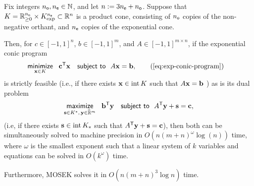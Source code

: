 \documentclass{article}
\begin{document}
\begin{lemma} \label{lem:mainlemma}
    Fix integers $n_{\sf o}, n_{\sf e} \in \mathbb N$, and let $n:= 3n_{\sf e} + n_{\sf o}$.
    Suppose that $K = \mathbb R_{\ge 0}^{n_{\sf o}} \times K^{n_{\sf e}}_{\exp} \subset \mathbb R^n$ is a product cone, consisting of $n_{\sf o}$ copies of the non-negative orthant, and $n_{\sf e}$ copies of the exponential cone. 
    
    Then, for
    $c \in [-1,1]^{n}$, $ b \in [-1,1]^m$, and $A \in [-1,1]^{m \times n}$,
    if the exponential conic program
    \begin{align*}
        &
        \mathop{\text{\sf minimize}}\limits_{
            \mat x \in K}~~ \mat c^{\sf T} \mat x
        \quad\text{\sf subject to}~~ A \mat x = \mat b,
        \tag{\ref{eq:exp-conic-program}}
    \end{align*}
    is strictly feasible (i.e., if there exists $\mathbf{x} \in \mathrm{int}\, K$  such that $A \mathbf{x} = \mathbf{b}$ )
    as is its dual problem
    \[
        \mathop{\text{\sf maximize}} 
            \limits_{
            \mathbf{s} \in K^*,\, \mathbf{y} \in \mskip1mu\overline{\mskip-1mu\mathbb R\!}\,^m} ~~ \mathbf{b}^{\sf T} \mathbf{y}
        \quad\text{\sf subject to}~~  A^{\sf T} \mathbf{y}  +  \mathbf{s} = \mathbf{c},
    \]
    (i.e, if there exists $\mathbf{s} \in \mathrm{int}\,K_*$ such that $A^{\sf T} \mathbf{y} + \mathbf{s} = \mathbf{c}$), 
    then both
    can be simultaneously
    solved to machine precision
    in $O(n (m+n)^{\omega} \log(n)
    )$ time,
    where $\omega$ is the smallest exponent such that a linear system of $k$ variables and equations can be solved in $O(k^\omega)$ time. 
    
    Furthermore, MOSEK solves it in $O(n (m+n)^3 \log n)$ time. 
\end{lemma}
\end{document}
